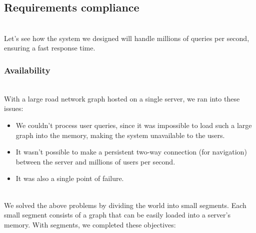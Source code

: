 

\subsection{Requirements compliance}\label{ygsCGbB_Y9HkygXSx2-Br}
\\
Let's see how the system we designed will handle millions of queries per second, ensuring a fast response time.

\subsubsection{Availability}\label{WZrKsEKgym5zmekiEV2Mz}
\\
With a large road network graph hosted on a single server, we ran into these issues:

\begin{itemize}
\item
\protect{}\label{ORt7SlnhzTD1MmQN2THUn}
We couldn't process user queries, since it was impossible to load such a large graph into the memory, making the system unavailable to the users.
\item
\protect{}\label{oSLE7hwPbDPY0XH_C1sjR}
It wasn't possible to make a persistent two-way connection (for navigation) between the server and millions of users per second.
\item
\protect{}\label{fRkD7TOb_inV53-lDCYfa}
It was also a single point of failure.
\end{itemize}
\\
We solved the above problems by dividing the world into small segments. Each small segment consists of a graph that can be easily loaded into a server's memory. With segments, we completed these objectives:


